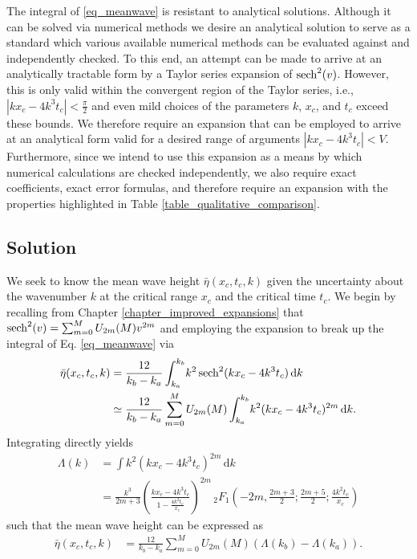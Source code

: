 The integral of \eqref{eq_meanwave} is resistant to analytical solutions.  Although it can be solved via numerical methods we desire an analytical solution to serve as a standard which various available numerical methods can be evaluated against and independently checked.  To this end, an attempt can be made to arrive at an analytically tractable form by a Taylor series expansion of $\operatorname{sech}^2(v)$.  However, this is only valid within the convergent region of the Taylor series, i.e., $|kx_c - 4k^3t_c| < \frac{\pi}{2}$ and even mild choices of the parameters $k$, $x_c$, and $t_c$ exceed these bounds.  We therefore require an expansion that can be employed to arrive at an analytical form valid for a desired range of arguments $|kx_c - 4k^3t_c| < V$.  Furthermore, since we intend to use this expansion as a means by which numerical calculations are checked independently, we also require exact coefficients, exact error formulas, and therefore require an expansion with the properties highlighted in Table \ref{table_qualitative_comparison}.

\subsection{Solution}
We seek to know the mean wave height $\bar{\eta}(x_c, t_c, k)$ given the uncertainty about the
wavenumber $k$ at the critical range $x_c$ and the critical time $t_c$.  We begin by recalling
from Chapter \ref{chapter_improved_expansions} that $\operatorname{sech}^2(v) = \sum_{m=0}^{M} U_{2m}(M) v^{2m}$
and employing the expansion to break up the integral of Eq. \ref{eq_meanwave} via
\begin{align}
	\bar{\eta}(x_c, t_c, k)
	    &= \frac{12}{k_b - k_a}
	    \int_{k_a}^{k_b} \! 
	    k^2 \operatorname{sech}^2(k x_c - 4 k^3 t_c) \,
	    \mathrm{d}k \nonumber\\
	    &\simeq \frac{12}{k_b - k_a} \sum_{m=0}^{M} U_{2m}(M)
	        \int_{k_a}^{k_b} \! k^2 (k x_c - 4 k^3 t_c)^{2m} \, \mathrm{d}k.
\end{align}
Integrating directly yields
\begin{align}
	\Lambda(k) &= \int \! k^2 (k x_c - 4 k^3 t_c)^{2m} \, \mathrm{d}k \nonumber \\
	    &= \frac{k^3}{2m+3}\left( \frac{k x_c - 4 k^3 t_c}{1 - \frac{4 k^2 t_c}{x_c}} \right)^{2m}
	      \, _2F_1\left(-2m,\frac{2m+3}{2};\frac{2m+5}{2}; \frac{4 k^2 t_c}{x_c}\right)
\end{align}
such that the mean wave height can be expressed as
\begin{align}
	\bar{\eta}(x_c, t_c, k)
	&= \frac{12}{k_b - k_a} \sum_{m=0}^{M} U_{2m}(M)\left(\Lambda(k_b) - \Lambda(k_a)\right).
\end{align}

